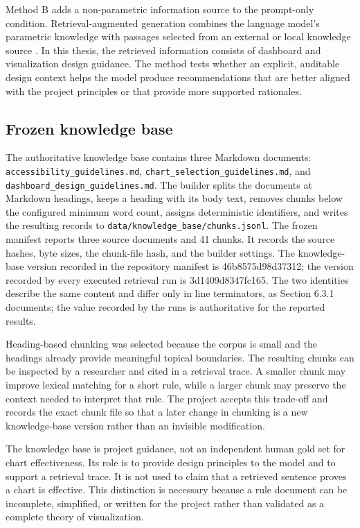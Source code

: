 Method B adds a non-parametric information source to the prompt-only condition. Retrieval-augmented generation combines the language model's parametric knowledge with passages selected from an external or local knowledge source \cite{lewis2020rag}. In this thesis, the retrieved information consists of dashboard and visualization design guidance. The method tests whether an explicit, auditable design context helps the model produce recommendations that are better aligned with the project principles or that provide more supported rationales.

\subsection{Frozen knowledge base}

The authoritative knowledge base contains three Markdown documents: \nolinkurl{accessibility_guidelines.md}, \nolinkurl{chart_selection_guidelines.md}, and \nolinkurl{dashboard_design_guidelines.md}. The builder splits the documents at Markdown headings, keeps a heading with its body text, removes chunks below the configured minimum word count, assigns deterministic identifiers, and writes the resulting records to \nolinkurl{data/knowledge_base/chunks.jsonl}. The frozen manifest reports three source documents and 41 chunks. It records the source hashes, byte sizes, the chunk-file hash, and the builder settings. The knowledge-base version recorded in the repository manifest is 46b8575d98d37312; the version recorded by every executed retrieval run is 3d1409d8347fc165. The two identities describe the same content and differ only in line terminators, as Section 6.3.1 documents; the value recorded by the runs is authoritative for the reported results.

Heading-based chunking was selected because the corpus is small and the headings already provide meaningful topical boundaries. The resulting chunks can be inspected by a researcher and cited in a retrieval trace. A smaller chunk may improve lexical matching for a short rule, while a larger chunk may preserve the context needed to interpret that rule. The project accepts this trade-off and records the exact chunk file so that a later change in chunking is a new knowledge-base version rather than an invisible modification.

The knowledge base is project guidance, not an independent human gold set for chart effectiveness. Its role is to provide design principles to the model and to support a retrieval trace. It is not used to claim that a retrieved sentence proves a chart is effective. This distinction is necessary because a rule document can be incomplete, simplified, or written for the project rather than validated as a complete theory of visualization.

